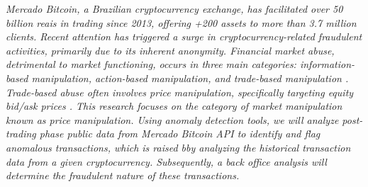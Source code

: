 \emph{Mercado Bitcoin, a Brazilian cryptocurrency exchange, has facilitated over 50 billion reais in trading since 2013,
offering +200 assets to more than 3.7 million clients. Recent attention has triggered a surge in cryptocurrency-related
fraudulent activities, primarily due to its inherent anonymity. Financial market abuse, detrimental to market
functioning, occurs in three main categories: information-based manipulation, action-based manipulation, and trade-based
manipulation \cite{allen1992stock}. Trade-based abuse often involves price manipulation, specifically targeting equity
bid/ask prices \cite{allen1992stock, allen2006large}. This research focuses on the category of market manipulation known
as price manipulation. Using anomaly detection tools, we will analyze post-trading phase public data from Mercado
Bitcoin API to identify and flag anomalous transactions, which is raised bby analyzing the historical transaction data
from a given cryptocurrency. Subsequently, a back office analysis will determine the fraudulent nature of these
transactions.}
